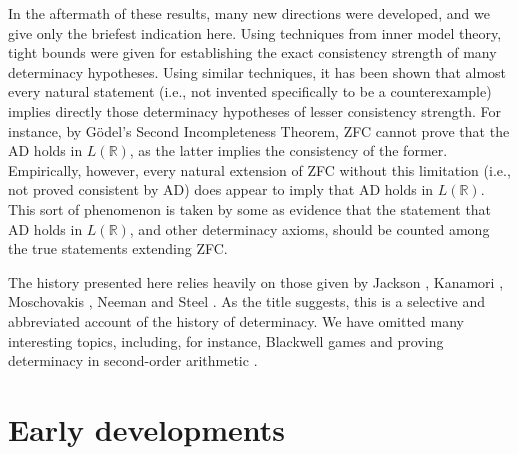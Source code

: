 \documentclass{book}%
\begin{document}

In the aftermath of these results, many new directions were developed, and we give only the briefest indication here.
Using techniques from inner model theory, tight bounds were given for establishing the exact consistency strength
of many determinacy hypotheses. Using similar techniques, it has been shown that almost every natural statement (i.e.,
not invented specifically to be a counterexample) implies directly those determinacy hypotheses of lesser
consistency strength. For instance, by G\"{o}del's Second Incompleteness Theorem, ZFC cannot prove that the AD holds in $L(\mathbb{R})$, as the latter
implies the consistency of the former. Empirically, however,
every natural extension of ZFC without this limitation (i.e., not proved consistent by AD) does appear to imply that AD holds in $L(\mathbb{R})$. This sort of
phenomenon is taken by some as evidence that the statement that AD holds in $L(\mathbb{R})$, and other determinacy axioms,
should be counted among the true statements extending ZFC.


The history presented here relies heavily on those given by Jackson
, Kanamori , Moschovakis , Neeman
 and Steel . As the title suggests, this is a selective and abbreviated account
of the history of determinacy. We have omitted many interesting topics, including, for instance,
Blackwell games \cite{Blackwell:1969, Martin:1998, MartinNeemanVervoort} and proving determinacy in second-order arithmetic \cite{LouveauSaintRaymond:1987, LouveauSaintRaymond:1988, KoellnerWoodin:handbook}.

\section{Early developments}

\end{document}

